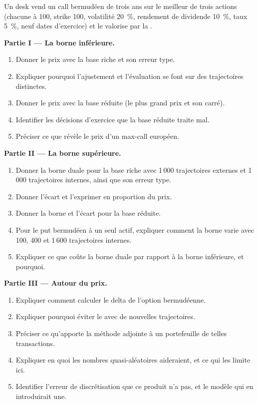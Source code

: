 \begin{problem}\label{pb:dv:monte-carlo-pricers-in-practice:1}
Un desk vend un call bermudéen de trois ans sur le meilleur de trois actions (chacune à 100, strike 100, volatilité 20~\%, rendement de dividende 10~\%, taux 5~\%, neuf dates d'exercice)
et le valorise par la .

\medskip\noindent\textbf{Partie I --- La borne inférieure.}
\begin{enumerate}
\item Donner le prix avec la base riche et son erreur type.
\item Expliquer pourquoi l'ajustement et l'évaluation se font sur des trajectoires distinctes.
\item Donner le prix avec la base réduite (le plus grand prix et son carré).
\item Identifier les décisions d'exercice que la base réduite traite mal.
\item Préciser ce que révèle le prix d'un max-call européen.
\end{enumerate}

\medskip\noindent\textbf{Partie II --- La borne supérieure.}
\begin{enumerate}[resume]
\item Donner la borne duale pour la base riche avec 1\,000 trajectoires externes et 1\,000 trajectoires internes, ainsi que son erreur type.
\item Donner l'écart et l'exprimer en proportion du prix.
\item Donner la borne et l'écart pour la base réduite.
\item Pour le put bermudéen à un seul actif, expliquer comment la borne varie avec 100, 400 et 1\,600 trajectoires internes.
\item Expliquer ce que coûte la borne duale par rapport à la borne inférieure, et pourquoi.
\end{enumerate}

\medskip\noindent\textbf{Partie III --- Autour du prix.}
\begin{enumerate}[resume]
\item Expliquer comment calculer le delta de l'option bermudéenne.
\item Expliquer pourquoi éviter le  avec de nouvelles trajectoires.
\item Préciser ce qu'apporte la méthode adjointe à un portefeuille de telles transactions.
\item Expliquer en quoi les nombres quasi-aléatoires aideraient, et ce qui les limite ici.
\item Identifier l'erreur de discrétisation que ce produit n'a pas, et le modèle qui en introduirait une.
\end{enumerate}


\end{problem}
